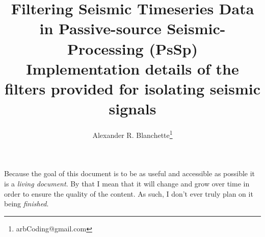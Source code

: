 \documentclass[american, twoside]{article}
\title{\Huge Filtering Seismic Timeseries Data in Passive-source Seismic-Processing (PsSp)\\
\large Implementation details of the filters provided for isolating seismic signals}
\author{Alexander R. Blanchette\thanks{arbCoding@gmail.com}}
\date{\Today}
\begin{document}
\maketitle
\pagestyle{fancy}
Because the goal of this document is to be as useful and accessible as possible it is a \textit{living document}. By that I mean
that it will change and grow over time in order to ensure the quality of the content. As such, I don't ever truly plan on it being
\textit{finished}.
\end{document}
